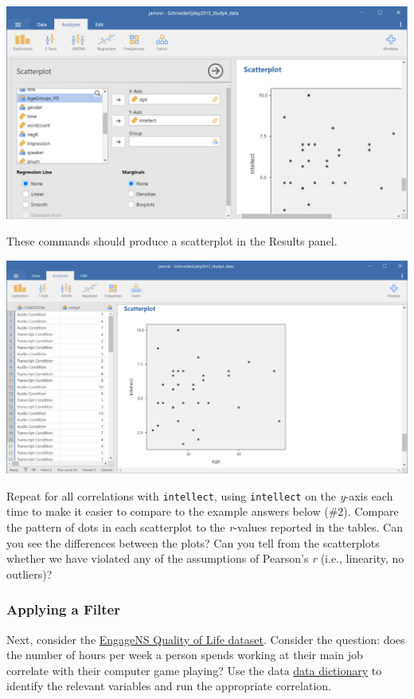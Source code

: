 \documentclass[
]{book}
\begin{document}
\includegraphics{img/7.4.68.png}

These commands should produce a scatterplot in the Results panel.

\includegraphics{img/7.4.69.png}

Repeat for all correlations with \texttt{intellect}, using \texttt{intellect} on the \emph{y}-axis each time to make it easier to compare to the example answers below (\#2). Compare the pattern of dots in each scatterplot to the \emph{r}-values reported in the tables. Can you see the differences between the plots? Can you tell from the scatterplots whether we have violated any of the assumptions of Pearson's \emph{r} (i.e., linearity, no outliers)?

\hypertarget{applying-a-filter}{%
\subsubsection{Applying a Filter}\label{applying-a-filter}}

Next, consider the \href{https://moodle.stfx.ca/mod/url/view.php?id=830017}{EngageNS Quality of Life dataset}. Consider the question: does the number of hours per week a person spends working at their main job correlate with their computer game playing? Use the data \href{https://moodle.stfx.ca/mod/url/view.php?id=830017}{data dictionary} to identify the relevant variables and run the appropriate correlation.
\end{document}
